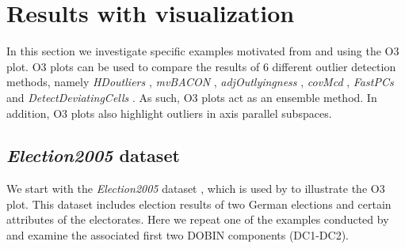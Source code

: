 \documentclass[11pt]{article}
\begin{document}
\section{Results with visualization}\label{sec:ResWithVis}
In this section we investigate specific examples motivated from \cite{unwin2019multivariate} and \cite{wilkinson2017visualizing} using the O3 plot. O3 plots \citep{unwin2019multivariate} can be used to compare the results of $6$ different outlier detection methods, namely \textit{HDoutliers} \citep{wilkinson2017visualizing}, \textit{mvBACON} \citep{billor2000bacon},  \textit{adjOutlyingness} \citep{brys2005robustification}, \textit{covMcd} \citep{rousseeuw1999fast} , \textit{FastPCs} \citep{vakili2014finding} and \textit{DetectDeviatingCells} \citep{rousseeuw2018detecting}. As such, O3 plots act as an ensemble method. In addition, O3 plots also highlight outliers in axis parallel subspaces. 

\subsection{\textit{Election2005} dataset}\label{sec:ResWithVis1}
We start with the \textit{Election2005} dataset \citep{mbgraphic}, which is used by \cite{unwin2019multivariate}  to illustrate the O3 plot. This dataset includes election results of two German elections and certain attributes of the electorates. Here we repeat one of the examples conducted by  \cite{unwin2019multivariate} and examine the associated  first two DOBIN components (DC1-DC2). \\
\end{document}
